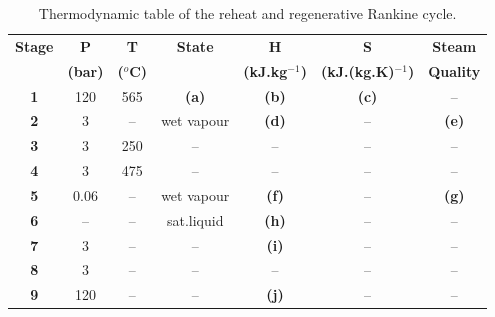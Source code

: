 \documentclass[calculator,steamtables,refrigeranttables,psychrometricchart,datasheet,solutions]{exam}
\begin{document}
\begin{question}
\begin{table}[!h]
\caption{Thermodynamic table of the reheat and regenerative Rankine cycle.}%
\begin{center}
\begin{tabular} {||c | c c c c c c || }
\hline\hline
{\bf Stage} & {\bf P}    & {\bf T}        & {\bf State}    & {\bf H}             & {\bf S}                  & {\bf Steam}\\
            & {\bf (bar)}& {\bf ($^{o}$C)} &               & {\bf (kJ.kg$^{-1}$)} & {\bf (kJ.(kg.K)$^{-1}$)}  & {\bf Quality}\\
\hline\hline
 {\bf 1 }   & 120        & 565            &   {\bf (a)}    & {\bf (b)}           & {\bf (c)}                & --          \\
 {\bf 2 }   & 3          &  --            &   wet vapour   & {\bf (d)}           &   --                     & {\bf (e)}   \\
 {\bf 3 }   & 3          & 250            &   --           & --                  & --                       & --           \\
 {\bf 4 }   & 3          & 475            &   --           & --                  & --                       & --            \\
 {\bf 5 }   & 0.06       & --             &   wet vapour   & {\bf (f)}           & --                       & {\bf (g)}     \\
 {\bf 6 }   & --         & --             &   sat.liquid   & {\bf (h)}           & --                       & -- \\
 {\bf 7 }   & 3          & --             &   --           & {\bf (i)}           & --                       & --     \\
 {\bf 8 }   & 3          & --             &   --           & --                  & --                       & --           \\
 {\bf 9 }   & 120        & --             &   --           & {\bf (j)}           &  --                      & -- \\
\hline\hline
\end{tabular}
\end{center}
\label{exam1_table1}
\end{table}



\end{question}
\end{document}

